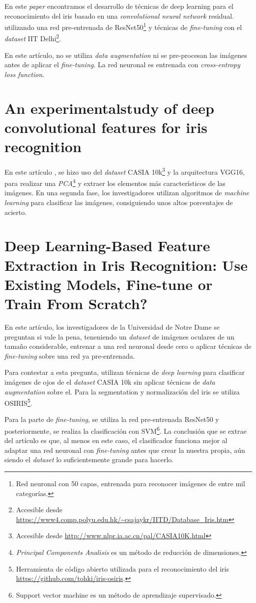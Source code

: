 En este \textit{paper} \cite{minaee_deepiris_2019} encontramos el desarrollo de técnicas de deep learning para el reconocimiento del iris basado en una \textit{convolutional neural network} residual. utilizando una red pre-entrenada 
de ResNet50\footnote{Red neuronal con 50 capas, entrenada para reconocer imágenes de entre mil categorías.} y técnicas de \textit{fine-tuning} con el \textit{dataset} IIT Delhi\footnote{Accesible desde \url{https://www4.comp.polyu.edu.hk/~csajaykr/IITD/Database_Iris.htm}}. 

En este artículo, no se utiliza \textit{data augmentation} ni se pre-procesan las imágenes antes de aplicar el \textit{fine-tuning}. La red neuronal es entrenada con \textit{cross-entropy loss function}. 

\section{ An experimentalstudy of deep convolutional features for iris recognition}

En este artículo \cite{minaee_experimental_2017}, se hizo uso del \textit{dataset} CASIA 10k\footnote{Accesible desde \url{http://www.nlpr.ia.ac.cn/pal/CASIA10K.html}} y la arquitectura VGG16, para realizar una \textit{PCA}\footnote{\textit{Principal Components Analisis} es un método de reducción de dimensiones.} y extraer los elementos
más característicos de las imágenes. En una segunda fase, los investigadores utilizan algoritmos de \textit{machine learning} para clasificar las imágenes, consiguiendo unos altos porcentajes de acierto.

\section{Deep Learning-Based Feature Extraction in Iris Recognition: Use Existing Models, Fine-tune or Train From Scratch?}


En este artículo\cite{boyd_deep_2020}, los investigadores de la Universidad de Notre Dame se preguntan si vale la pena, teneniendo un \textit{dataset} de imágenes oculares de un tamaño considerable,
entrenar a una red neuronal desde cero o aplicar técnicas de \textit{fine-tuning} sobre una red ya pre-entrenada.

Para contestar a esta pregunta, utilizan técnicas de \textit{deep learning} para clasificar imágenes de ojos de el \textit{dataset} CASIA 10k sin aplicar técnicas de \textit{data augmentation} sobre el. 
Para la segmentation y normalización del iris se utiliza OSIRIS\footnote{Herramienta de código abierto utilizada para el reconocimiento del iris \url{https://github.com/tohki/iris-osiris}.}.

Para la parte de \textit{fine-tuning}, se utiliza la red pre-entrenada ResNet50 y posteriormente, se realiza la clasificación con SVM\footnote{Support vector machine es un método de aprendizaje supervisado.}.
La conclusión que se extrae del artículo es que, al menos en este caso, el clasificador funciona mejor al adaptar una red neuronal con \textit{fine-tuning} antes que crear la nuestra propia, aún siendo el 
\textit{dataset} lo suficientemente grande para hacerlo.
